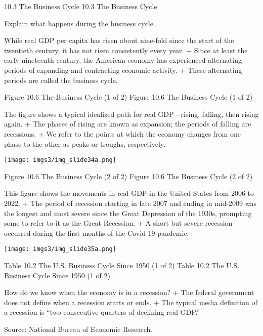 \documentclass[
  12pt,
  ignorenonframetext,
]{beamer}
\begin{document}
\begin{frame}{10.3 The Business Cycle}
\protect\hypertarget{the-business-cycle}{}
10.3 The Business Cycle

Explain what happens during the business cycle.

While real GDP per capita has risen about nine-fold since the start of
the twentieth century, it has not risen consistently every year. + Since
at least the early nineteenth century, the American economy has
experienced alternating periods of expanding and contracting economic
activity. + These alternating periods are called the business cycle.
\end{frame}

\begin{frame}{Figure 10.6 The Business Cycle (1 of 2)}
\protect\hypertarget{figure-10.6-the-business-cycle-1-of-2}{}
Figure 10.6 The Business Cycle (1 of 2)

The figure shows a typical idealized path for real GDP---rising,
falling, then rising again. + The phases of rising are known as
expansion; the periods of falling are recessions. + We refer to the
points at which the economy changes from one phase to the other as peaks
or troughs, respectively.

\texttt{[image: imgs3/img\_slide34a.png]}
\end{frame}

\begin{frame}{Figure 10.6 The Business Cycle (2 of 2)}
\protect\hypertarget{figure-10.6-the-business-cycle-2-of-2}{}
Figure 10.6 The Business Cycle (2 of 2)

This figure shows the movements in real GDP in the United States from
2006 to 2022. + The period of recession starting in late 2007 and ending
in mid-2009 was the longest and most severe since the Great Depression
of the 1930s, prompting some to refer to it as the Great Recession. + A
short but severe recession occurred during the first months of the
Covid-19 pandemic.

\texttt{[image: imgs3/img\_slide35a.png]}
\end{frame}

\begin{frame}{Table 10.2 The U.S. Business Cycle Since 1950 (1 of 2)}
\protect\hypertarget{table-10.2-the-u.s.-business-cycle-since-1950-1-of-2}{}
Table 10.2 The U.S. Business Cycle Since 1950 (1 of 2)

How do we know when the economy is in a recession? + The federal
government does not define when a recession starts or ends. + The
typical media definition of a recession is ``two consecutive quarters of
declining real GDP.''

Source: National Bureau of Economic Research.
\end{frame}
\end{document}
